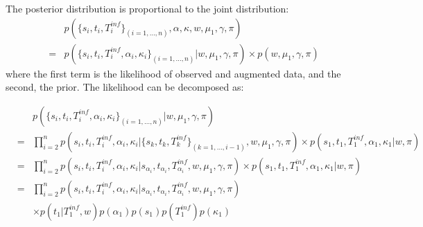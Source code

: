 \documentclass[10pt]{article}
\begin{document}
The posterior distribution is proportional to the joint distribution:
\begin{eqnarray}
& & p(\{s_i, t_i, T_i^{inf}\}_{(i=1,\ldots,n)}, \alpha, \kappa, w, \mu_1, \gamma, \pi)\\
& = & p(\{s_i, t_i, T_i^{inf}, \alpha_i, \kappa_i\}_{(i=1,\ldots,n)}| w, \mu_1, \gamma, \pi) \times p( w, \mu_1, \gamma, \pi)
\end{eqnarray}
where the first term is the likelihood of observed and augmented data, and the second, the prior.
The likelihood can be decomposed as:

\begin{eqnarray}
& & p(\{s_i, t_i, T_i^{inf}, \alpha_i, \kappa_i\}_{(i=1,\ldots,n)}|  w, \mu_1, \gamma, \pi) \\
& = & \prod_{i=2}^n p(s_i, t_i, T_i^{inf}, \alpha_i, \kappa_i | \{s_k, t_k, T_k^{inf} \}_{(k=1,\ldots,i-1)}, w, \mu_1, \gamma, \pi) 
  \times p(s_1, t_1, T_1^{inf}, \alpha_1, \kappa_1 |w, \pi)\\
& = & \prod_{i=2}^n p(s_i, t_i, T_i^{inf}, \alpha_i, \kappa_i| s_{\alpha_i}, t_{\alpha_i}, T_{\alpha_i}^{inf},  w, \mu_1, \gamma, \pi) 
  \times p(s_1, t_1 , T_1^{inf}, \alpha_1, \kappa_1 |w, \pi)\\
& = & \prod_{i=2}^n p(s_i, t_i, T_i^{inf}, \alpha_i, \kappa_i | s_{\alpha_i}, t_{\alpha_i}, T_{\alpha_i}^{inf},  w, \mu_1, \gamma, \pi)\\ 
 & & \times p(t_1 | T_1^{inf},w) p(\alpha_1) p(s_1) p(T_1^{inf}) p(\kappa_1) 
\end{eqnarray}
\end{document}
